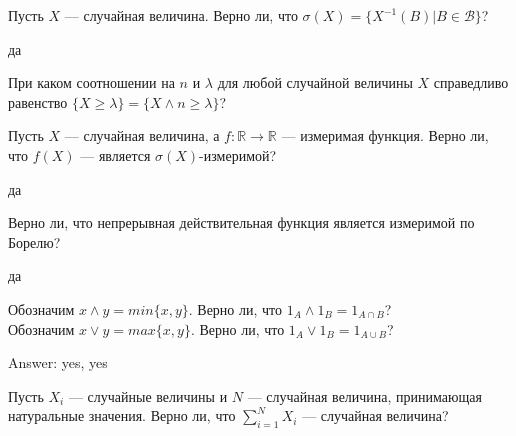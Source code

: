 \begin{problem}
Пусть $X$ --- случайная величина. Верно ли, что
$\sigma(X)=\{X^{-1}(B)|B \in \mathcal{B} \}$? 
\end{problem} 
\begin{solution} 
да
\end{solution}

\begin{problem}
При каком соотношении на $n$ и $\lambda$ для любой случайной
величины $X$ справедливо равенство $\{X\ge \lambda\}=\{X\wedge
n\ge\lambda\}$? 
\end{problem} 
\begin{solution} 

\end{solution}

\begin{problem}
Пусть $X$ --- случайная величина, а $f:\mathbb{R}\rightarrow
\mathbb{R}$ --- измеримая функция.
Верно ли, что $f(X)$ --- является $\sigma(X)$-измеримой? 
\end{problem} 
\begin{solution} 
да
\end{solution}

\begin{problem}
Верно ли, что непрерывная действительная функция является
измеримой по Борелю? 
\end{problem} 
\begin{solution} 
да
\end{solution}

\begin{problem}
Обозначим $x \wedge y = min\{x,y\}$. Верно ли, что $1_{A} \wedge
1_{B}=1_{A\cap B}$? \\
Обозначим $x \vee y = max\{x,y\}$. Верно ли, что $1_{A} \vee
1_{B}=1_{A\cup B}$? 
\end{problem} 
\begin{solution} 

Answer: yes, yes 
\end{solution}

\begin{problem}
Пусть $X_{i}$ --- случайные величины и $N$ --- случайная величина,
принимающая натуральные значения. Верно ли, что
$\sum_{i=1}^{N}X_{i}$ --- случайная величина? 
\end{problem} 
\begin{solution} 

\end{solution}

